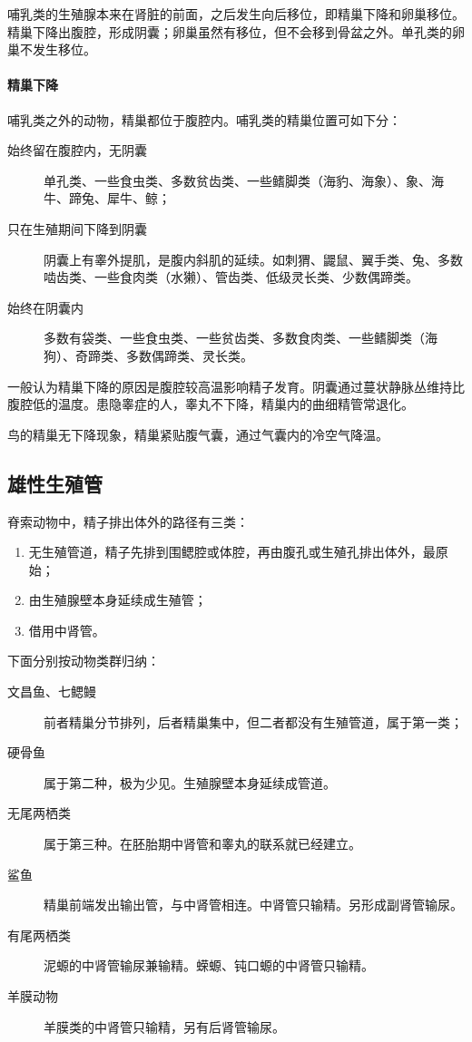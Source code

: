 哺乳类的生殖腺本来在肾脏的前面，之后发生向后移位，即精巢下降和卵巢移位。精巢下降出腹腔，形成阴囊；卵巢虽然有移位，但不会移到骨盆之外。单孔类的卵巢不发生移位。

\paragraph{精巢下降}

哺乳类之外的动物，精巢都位于腹腔内。哺乳类的精巢位置可如下分：
\begin{description}
	\item[始终留在腹腔内，无阴囊] 单孔类、一些食虫类、多数贫齿类、一些鳍脚类（海豹、海象）、象、海牛、蹄兔、犀牛、鲸；
	\item[只在生殖期间下降到阴囊] 阴囊上有睾外提肌，是腹内斜肌的延续。如刺猬、鼹鼠、翼手类、兔、多数啮齿类、一些食肉类（水獭）、管齿类、低级灵长类、少数偶蹄类。
	\item[始终在阴囊内] 多数有袋类、一些食虫类、一些贫齿类、多数食肉类、一些鳍脚类（海狗）、奇蹄类、多数偶蹄类、灵长类。
\end{description}

一般认为精巢下降的原因是腹腔较高温影响精子发育。阴囊通过蔓状静脉丛维持比腹腔低的温度。患隐睾症的人，睾丸不下降，精巢内的曲细精管常退化。

鸟的精巢无下降现象，精巢紧贴腹气囊，通过气囊内的冷空气降温。

\subsection{雄性生殖管}

脊索动物中，精子排出体外的路径有三类：
\begin{enumerate}
	\item 无生殖管道，精子先排到围鳃腔或体腔，再由腹孔或生殖孔排出体外，最原始；
	\item 由生殖腺壁本身延续成生殖管；
	\item 借用中肾管。
\end{enumerate}

下面分别按动物类群归纳：
\begin{description}
	\item[文昌鱼、七鳃鳗] 前者精巢分节排列，后者精巢集中，但二者都没有生殖管道，属于第一类；
	\item[硬骨鱼] 属于第二种，极为少见。生殖腺壁本身延续成管道。
	\item[无尾两栖类] 属于第三种。在胚胎期中肾管和睾丸的联系就已经建立。
	\item[鲨鱼] 精巢前端发出输出管，与中肾管相连。中肾管只输精。另形成副肾管输尿。
	\item[有尾两栖类] 泥螈的中肾管输尿兼输精。蝾螈、钝口螈的中肾管只输精。
	\item[羊膜动物] 羊膜类的中肾管只输精，另有后肾管输尿。
\end{description}

